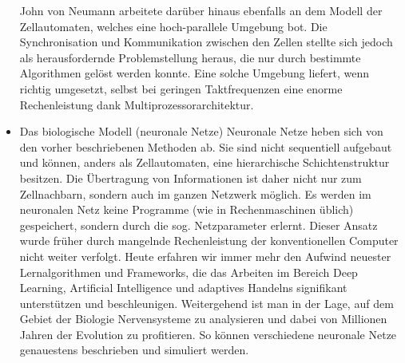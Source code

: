 \begin{itemize}
			\subitem John von Neumann arbeitete darüber hinaus ebenfalls an dem Modell der Zellautomaten, welches eine hoch-parallele Umgebung bot. Die Synchronisation und Kommunikation zwischen den Zellen stellte sich jedoch als herausfordernde Problemstellung heraus, die nur durch bestimmte Algorithmen gelöst werden konnte. Eine solche Umgebung liefert, wenn richtig umgesetzt, selbst bei geringen Taktfrequenzen eine enorme Rechenleistung dank Multiprozessorarchitektur.
		\item Das biologische Modell (neuronale Netze)
			\subitem Neuronale Netze heben sich von den vorher beschriebenen Methoden ab. Sie sind nicht sequentiell aufgebaut und können, anders als Zellautomaten, eine hierarchische Schichtenstruktur besitzen. Die Übertragung von Informationen ist daher nicht nur zum Zellnachbarn, sondern auch im ganzen Netzwerk möglich. Es werden im neuronalen Netz keine Programme (wie in Rechenmaschinen üblich) gespeichert, sondern durch die sog. Netzparameter erlernt. Dieser Ansatz wurde früher durch mangelnde Rechenleistung der konventionellen Computer nicht weiter verfolgt. Heute erfahren wir immer mehr den Aufwind neuester Lernalgorithmen und Frameworks, die das Arbeiten im Bereich Deep Learning, Artificial Intelligence und adaptives Handelns signifikant unterstützen und beschleunigen. Weitergehend ist man in der Lage, auf dem Gebiet der Biologie Nervensysteme zu analysieren und dabei von Millionen Jahren der Evolution zu profitieren. So können verschiedene neuronale Netze genauestens beschrieben und simuliert werden.
	\end{itemize}
